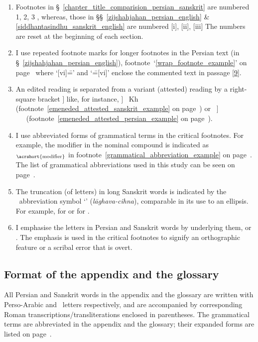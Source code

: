 \begin{enumerate}[topsep=0pt]
    \item Footnotes in \S~\ref{chapter_title_comparision_persian_sanskrit} are numbered 1, 2, 3 \etcp, whereas, those in \S\S~\ref{zijshahjahan_persian_english} \& \ref{siddhantasindhu_sanskrit_english} are numbered [i], [ii], [iii] \etc The numbers are reset at the beginning of each section. 
    \item I use repeated footnote marks for longer footnotes in the Persian text (in \S~\ref{zijshahjahan_persian_english}), \eg footnote~`\ref{wrap_footnote_example}' on page~\pageref{wrap_footnote_example} where `[vi]\==' and `\==[vi]' enclose the commented text in passage [\hyperlink{Ppass9}{9}].   
    \item An edited reading is separated from a variant (attested) reading by a right-square bracket {$\Big]$} like, for instance,  {$\Big ]$} ~Kh (footnote~\ref{emeneded_attested_sanskrit_example} on page~\pageref{emeneded_attested_sanskrit_example}) or ~{$\Big ]$}~~\SjB\ (footnote~\ref{emeneded_attested_persian_example} on page~\pageref{emeneded_attested_persian_example}).
    \item I use abbreviated forms of grammatical terms in the critical footnotes. For example, the \acrfull{modifier}  in the nominal compound  is indicated as \,$_\text{\acrshort{modifier}}$ in footnote~\ref{grammatical_abbreviation_example} on page~\pageref{grammatical_abbreviation_example}. The list of grammatical abbreviations used in this study can be seen on page~\pageref{acronym}.  
    \item The truncation (of letters) in long Sanskrit words is indicated by the \Nagari\ abbreviation symbol `\tsans{\selip}' (\textit{lāghava-cihna}), comparable in its use to an ellipsis. For example,  for   or  for . 
    \item I emphasise the letters in Persian and Sanskrit words by underlying them, \eg {} or . The emphasis is used in the critical footnotes to signify an orthographic feature or a scribal error that is overt.
\end{enumerate}

\subsection{Format of the appendix and the glossary} \label{glossary_appendix_format} 
All Persian and Sanskrit words in the appendix and the glossary are written with Perso-Arabic and \Nagari\ letters respectively, and are accompanied by corresponding Roman transcriptions/transliterations enclosed in parentheses. The grammatical terms are abbreviated in the appendix and the glossary; their expanded forms are listed on page~\pageref{acronym}. 

